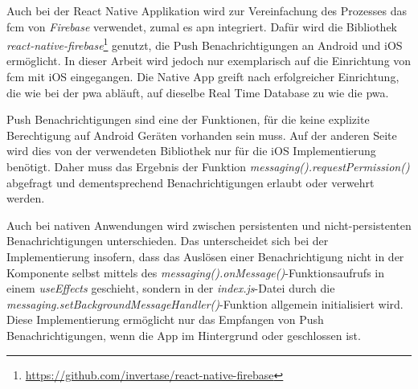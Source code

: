 Auch bei der React Native Applikation wird zur Vereinfachung des Prozesses das \ac{fcm} von \textit{Firebase} verwendet, zumal es \ac{apn} integriert.
Dafür wird die Bibliothek \textit{react-native-firebase}\footnote{\url{https://github.com/invertase/react-native-firebase}} genutzt, die Push Benachrichtigungen an Android und iOS ermöglicht.
In dieser Arbeit wird jedoch nur exemplarisch auf die Einrichtung von \ac{fcm} mit iOS eingegangen.
Die Native App greift nach erfolgreicher Einrichtung, die wie bei der \ac{pwa} abläuft, auf dieselbe Real Time Database zu wie die \ac{pwa}.

Push Benachrichtigungen sind eine der Funktionen, für die keine explizite Berechtigung auf Android Geräten vorhanden sein muss.
Auf der anderen Seite wird dies von der verwendeten Bibliothek nur für die iOS Implementierung benötigt.
Daher muss das Ergebnis der Funktion \textit{messaging().requestPermission()} abgefragt und dementsprechend Benachrichtigungen erlaubt oder verwehrt werden.

Auch bei nativen Anwendungen wird zwischen persistenten und nicht-persistenten Benachrichtigungen unterschieden.
Das unterscheidet sich bei der Implementierung insofern, dass das Auslösen einer Benachrichtigung nicht in der Komponente selbst mittels des \textit{messaging().onMessage()}-Funktionsaufrufs in einem \textit{useEffects} geschieht, sondern in der \textit{index.js}-Datei durch die \textit{messaging.setBackgroundMessageHandler()}-Funktion allgemein initialisiert wird.
Diese Implementierung ermöglicht nur das Empfangen von Push Benachrichtigungen, wenn die App im Hintergrund oder geschlossen ist.